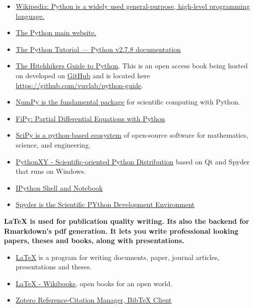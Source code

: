 \documentclass[11pt]{article} %
\begin{document}
      \begin{itemize}
        \item \href{"https://en.wikipedia.org/wiki/Python_(programming_language)"}{Wikipedia: Python is a widely used general-purpose, high-level programming language.}  \cite{python_python_2014}
        \item \href{"https://www.python.org/"}{The Python main website.} \cite{python_python.org_2013}
        \item \href{"https://docs.python.org/2/tutorial/"}{The Python Tutorial — Python v2.7.8 documentation}  \cite{python_python_2014}
        \item \href{"http://docs.python-guide.org/en/latest/"}{The Hitchhikers Guide to Python}. This is an open access book being hosted on developed on \href{"https://github.com/"}{GitHub} and is located here \href{"https://github.com/vuvlab/python-guide"}{https://github.com/vuvlab/python-guide}. \cite{_hitchhikers_2014} \cite{_kennethreitz/python-guide_2014}
        \item \href{"http://www.numpy.org"}{NumPy is the fundamental package} \cite{numpy_numpy_2014} for scientific computing with Python.
        \item \href{"http://www.ctcms.nist.gov/fipy/"}{FiPy: Partial Differential Equations with Python} \cite{guyer_fipy:_2009}
        \item \href{"http://www.scipy.org/"}{SciPy is a python-based ecosystem}  \cite{scipy_scipy.org_2014} of open-source software for mathematics, science, and engineering. 
        \item \href{"https://code.google.com/p/pythonxy/"}{PythonXY - Scientific-oriented Python Distribution} based on Qt and Spyder that runs on Windows. \cite{pythonxy_pythonxy_2014}
        \item \href{"http://ipython.org/index.html"}{IPython Shell and Notebook}  \cite{ipython_ipython_2014}
        \item \href{"https://code.google.com/p/spyderlib/"}{Spyder is the Scientific PYthon Development Environment}  \cite{spyder_spyder_2014}
      \end{itemize}
    
    {\bf LaTeX is used for publication quality writing. Its also the backend for Rmarkdown's pdf generation. It lets you write professional looking papers, theses and books, along with presentations. } 
      \begin{itemize}
        \item \href{"http://www.tug.org/"}{LaTeX} is a program for writing documents, paper, journal articles, presentations and theses. \cite{_tex_2014}
        \item \href{"http://en.wikibooks.org/wiki/LaTeX"}{LaTeX - Wikibooks}, open books for an open world. \cite{latex_latex_2014}
        \item \href{"https://www.zotero.org/"}{Zotero Reference-Citation Manager, BibTeX Client}  \cite{zotero_zotero_2014}
      \end{itemize}
\end{document}
